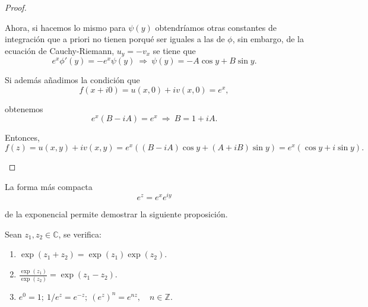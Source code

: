 \begin{proof}
\begin{enumerate}
Ahora, si hacemos lo mismo para $\psi(y)$ obtendríamos otras constantes de integración que a priori no tienen porqué ser iguales a las de $\phi$, sin embargo, de la ecuación de Cauchy-Riemann, $u_y = -v_x$ se tiene que
\begin{equation*}
e^x \phi'(y) = -e^x \psi(y) ~\Rightarrow~ \psi(y) = -A \cos y + B \sin y.
\end{equation*}

Si además añadimos la condición que  
$$f(x+i0) = u(x,0) + i v(x,0) = e^x,$$

obtenemos 
$$e^x (B - iA) = e^x ~\Rightarrow~ B = 1 + iA.$$

Entonces,
$$f(z) = u(x,y) + i v(x,y) = e^x ((B-iA) \cos y + (A + iB)\sin y) = e^x (\cos y + i \sin y).$$
\end{enumerate}
\end{proof}



La forma más compacta 
$$e^z = e^xe^{iy}$$

de la exponencial permite demostrar la siguiente proposición.

\begin{propo}
Sean $z_1, z_2 \in \mathbb{C}$, se verifica: 

\begin{enumerate}
\item $\exp(z_1 + z_2) = \exp(z_1) \exp(z_2)$.

\item $\frac{\exp(z_1)}{\exp(z_2)} = \exp(z_1 - z_2)$.

\item $e^0= 1; ~ 1/e^z = e^{-z}; ~ (e^z)^n = e^{nz}, \quad n \in \mathbb{Z}.$
\end{enumerate}
\end{propo}


